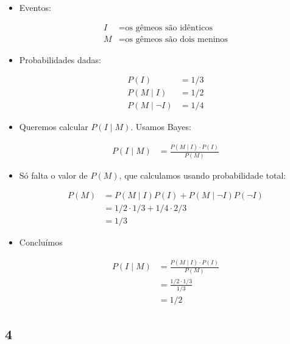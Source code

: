 \documentclass[
  11pt]{report}
\begin{document}
\begin{itemize}
\item
  Eventos:

  \[
  \begin{aligned}
  I &= \text{os gêmeos são idênticos} \\
  M &= \text{os gêmeos são dois meninos}
  \end{aligned}
  \]
\item
  Probabilidades dadas:

  \[
  \begin{aligned}
  P(I) &= 1/3 \\
  P(M \mid I) &= 1/2 \\
  P(M \mid \neg I) &= 1/4
  \end{aligned}
  \]
\item
  Queremos calcular $P(I \mid M)$. Usamos Bayes:

  \[
  \begin{aligned}
  P(I \mid M) 
  &=
  \frac{P(M \mid I) \cdot P(I)}{P(M)}
  \end{aligned}
  \]
\item
  Só falta o valor de $P(M)$, que calculamos usando probabilidade total:

  \[
  \begin{aligned}
  P(M) 
  &=
  P(M \mid I)P(I) + P(M \mid \neg I)P(\neg I) \\
  &=
  1/2 \cdot 1/3 + 1/4 \cdot 2/3 \\
  &=
  1/3
  \end{aligned}
  \]
\item
  Concluímos

  \[
  \begin{aligned}
  P(I \mid M) 
  &=
  \frac{P(M \mid I) \cdot P(I)}{P(M)} \\
  &=
  \frac{1/2 \cdot 1/3}{1/3} \\
  &=
  1/2
  \end{aligned}
  \]
\end{itemize}

\hypertarget{section-9}{%
\subsection*{4}\label{section-9}}
\end{document}
